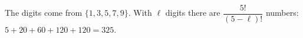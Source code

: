 The digits come from $\{1,3,5,7,9\}$. With $\ell$ digits there are $\dfrac{5!}{(5-\ell)!}$ numbers: $5+20+60+120+120=\boxed{325}$.
